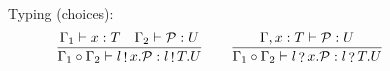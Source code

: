 \begin{figure}[h!]
  Typing (choices):\hfill{}
    \begin{gather*}
      \frac{\algprocin{\Gamma_1}{x : T}\quad\algprocin{\Gamma_2}{\proc{P} : U}}
           {\algprocin{\splitContext{\Gamma_1}{\Gamma_2}}{l \sout x . \proc{P} : l \sout T . U}}\qquad
      \frac{\algprocin{\Gamma, x : T}{\proc{P} : U}}
           {\algprocin{\splitContext{\Gamma_1}{\Gamma_2}}{l \sint x . \proc{P} : l \sint T . U}}
%
    \end{gather*}
\end{figure}



